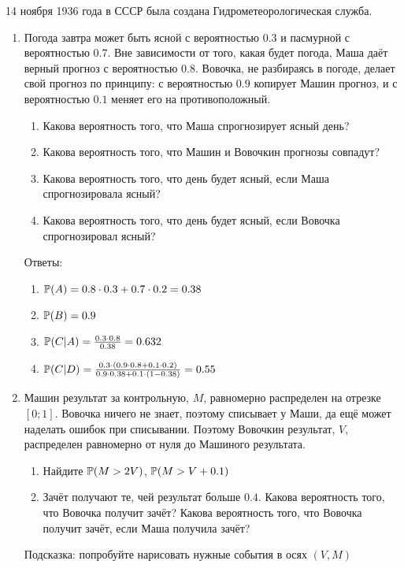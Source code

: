 \documentclass[12pt, a4paper]{article}\usepackage[]{graphicx}\usepackage[]{color}
\begin{document}


\vspace{20pt}
14 ноября 1936 года в СССР была создана Гидрометеорологическая служба.
\vspace{20pt}

\begin{enumerate}

\item Погода завтра может быть ясной с вероятностью $0.3$ и пасмурной с вероятностью $0.7$. Вне зависимости от того, какая будет погода, Маша даёт верный прогноз с вероятностью $0.8$. Вовочка, не разбираясь в погоде, делает свой прогноз по принципу: с вероятностью $0.9$ копирует Машин прогноз, и с вероятностью $0.1$ меняет его на противоположный.
\begin{enumerate}
\item Какова вероятность того, что Маша спрогнозирует ясный день?
\item Какова вероятность того, что Машин и Вовочкин прогнозы совпадут?
\item Какова вероятность того, что день будет ясный, если Маша спрогнозировала ясный?
\item Какова вероятность того, что день будет ясный, если Вовочка спрогнозировал ясный?
\end{enumerate}

Ответы:
\begin{enumerate}
\item $\P(A)=0.8\cdot 0.3+0.7\cdot 0.2=0.38$
\item $\P(B)=0.9$
\item $\P(C|A)=\frac{0.3\cdot 0.8}{0.38}=0.632$
\item $\P(C|D)=\frac{0.3\cdot (0.9\cdot 0.8+0.1\cdot 0.2)}{0.9\cdot 0.38+0.1\cdot (1-0.38)}=0.55$
\end{enumerate}


\item Машин результат за контрольную, $M$, равномерно распределен на отрезке $[0;1]$. Вовочка ничего не знает, поэтому списывает у Маши, да ещё может наделать ошибок при списывании. Поэтому Вовочкин результат, $V$, распределен равномерно от нуля до Машиного результата.
\begin{enumerate}
\item Найдите $\P(M>2V)$, $\P(M>V+0.1)$
\item Зачёт получают те, чей результат больше $0.4$. Какова вероятность того, что Вовочка получит зачёт? Какова вероятность того, что Вовочка получит зачёт, если Маша получила зачёт?
\end{enumerate}
Подсказка: попробуйте нарисовать нужные события в осях $(V,M)$


\end{enumerate}
\end{document}
